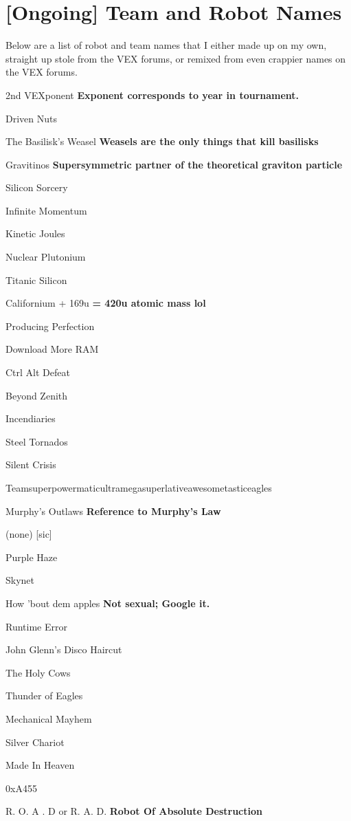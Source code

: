 \section{[Ongoing] Team and Robot Names}

Below are a list of robot and team names that I either made up on my own, straight up stole from the VEX forums, or remixed from even crappier names on the VEX forums.


2nd VEXponent \textbf{Exponent corresponds to year in tournament.}

Driven Nuts

The Basilisk’s Weasel \textbf{Weasels are the only things that kill basilisks}

Gravitinos \textbf{Supersymmetric partner of the theoretical graviton particle}

Silicon Sorcery

Infinite Momentum

Kinetic Joules

Nuclear Plutonium

Titanic Silicon

Californium + 169u \textbf{= 420u atomic mass lol}

Producing Perfection

Download More RAM

Ctrl Alt Defeat

Beyond Zenith

Incendiaries

Steel Tornados

Silent Crisis

Teamsuperpowermaticultramegasuperlativeawesometasticeagles

Murphy’s Outlaws \textbf{Reference to Murphy's Law}

(none) [sic]

Purple Haze

Skynet

How 'bout dem apples \textbf{Not sexual; Google it.}

Runtime Error

John Glenn’s Disco Haircut

The Holy Cows

Thunder of Eagles

Mechanical Mayhem

Silver Chariot

Made In Heaven

0xA455

R. O. A . D  or R. A. D. \textbf{Robot Of Absolute Destruction}
